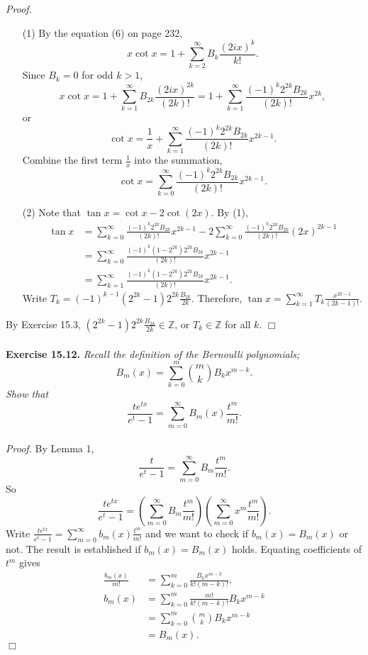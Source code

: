 \documentclass{article}
\begin{document}
\emph{Proof.}
\begin{enumerate}
\item[(1)]
By the equation (6) on page 232,
$$x \cot x = 1 + \sum_{k=2}^{\infty} B_k \frac{(2ix)^k}{k!}.$$
Since $B_k = 0$ for odd $k > 1$,
$$x \cot x
= 1 + \sum_{k=1}^{\infty} B_{2k} \frac{(2ix)^{2k}}{(2k)!}
= 1 + \sum_{k=1}^{\infty} \frac{(-1)^k 2^{2k}B_{2k}}{(2k)!} x^{2k},$$
or
$$\cot x
= \frac{1}{x} + \sum_{k=1}^{\infty} \frac{(-1)^k 2^{2k}B_{2k}}{(2k)!} x^{2k-1}.$$
Combine the first term $\frac{1}{x}$ into the summation,
$$\cot x = \sum_{k=0}^{\infty} \frac{(-1)^k 2^{2k}B_{2k}}{(2k)!} x^{2k-1}.$$
\item[(2)]
Note that $\tan x = \cot x - 2 \cot(2x)$.
By (1),
\begin{align*}
\tan x
&= \sum_{k=0}^{\infty} \frac{(-1)^k 2^{2k}B_{2k}}{(2k)!} x^{2k-1}
- 2 \sum_{k=0}^{\infty} \frac{(-1)^k 2^{2k}B_{2k}}{(2k)!} (2x)^{2k-1} \\
&= \sum_{k=0}^{\infty} \frac{(-1)^k (1 - 2^{2k}) 2^{2k} B_{2k}}{(2k)!} x^{2k-1} \\
&= \sum_{k=1}^{\infty} \frac{(-1)^k (1 - 2^{2k}) 2^{2k} B_{2k}}{(2k)!} x^{2k-1}.
\end{align*}
Write $T_k = (-1)^{k-1} (2^{2k} - 1) 2^{2k} \frac{B_{2k}}{2k}$.
Therefore, $\tan x = \sum_{k=1}^{\infty} T_k \frac{x^{2k - 1}}{(2k - 1)!}$.
\end{enumerate}
By Exercise 15.3, $(2^{2k} - 1) 2^{2k} \frac{B_{2k}}{2k} \in \mathbb{Z}$,
or $T_k \in \mathbb{Z}$ for all $k$.
$\Box$ \\\\



\textbf{Exercise 15.12.}
\emph{Recall the definition of the Bernoulli polynomials;
$$B_m(x) = \sum_{k=0}^{m} {m \choose k} B_k x^{m-k}.$$
Show that
$$\frac{te^{tx}}{e^t - 1} = \sum_{m=0}^{\infty} B_m(x) \frac{t^m}{m!}.$$} \\

\emph{Proof.}
By Lemma 1,
$$\frac{t}{e^t - 1} = \sum_{m=0}^{\infty} B_m \frac{t^m}{m!}.$$
So
$$
\frac{te^{tx}}{e^t - 1}
=
\left( \sum_{m=0}^{\infty} B_m \frac{t^m}{m!} \right)
\left( \sum_{m=0}^{\infty} x^m \frac{t^m}{m!} \right).$$
Write $\frac{te^{tx}}{e^t - 1} = \sum_{m=0}^{\infty} b_m(x) \frac{t^m}{m!}$
and we want to check if $b_m(x) = B_m(x)$ or not.
The result is established if $b_m(x) = B_m(x)$ holds.
Equating coefficients of $t^m$ gives
\begin{align*}
\frac{b_m(x)}{m!}
&= \sum_{k=0}^{m} \frac{B_k x^{m-k}}{k!(m-k)!}, \\
b_m(x)
&= \sum_{k=0}^{m} \frac{m!}{k!(m-k)!} B_k x^{m-k} \\
&= \sum_{k=0}^{m} {m \choose k} B_k x^{m-k} \\
&= B_m(x).
\end{align*}
$\Box$ \\\\
\end{document}
